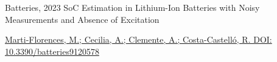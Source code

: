 \cventry
  {Batteries, 2023}
  {SoC Estimation in Lithium-Ion Batteries with Noisy Measurements and Absence of Excitation}
  {}
  {}
  {
    \begin{cvitems}
      \item {\href{https://doi.org/10.3390/batteries9120578}{Marti-Florences, M.; Cecilia, A.; Clemente, A.; Costa-Castell\'o, R. DOI: 10.3390/batteries9120578}}
    \end{cvitems}
  }

